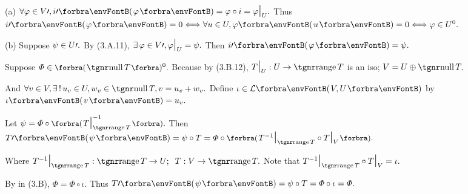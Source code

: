 \par\quad
(a) $\forall\varphi\in V\apostrophe,i\apostrophe\Par{\varphi}=\varphi\circ i=\varphi\mmid_U.$ Thus $i\apostrophe\Par{\varphi}=0\Longleftrightarrow\forall u\in U,\varphi\Par{u}=0\Longleftrightarrow\varphi\in U^0.$\par\quad
(b) Suppose $\psi\in U\prime.$ By (3.A.11), $\exists\,\varphi\in V\prime,\varphi\text{\Large|}_U=\psi.$ Then $i\apostrophe\Par{\varphi}=\psi.$\PfEnd
\SepLine

\par\quad
Suppose $\varPhi\in\BigPar{\null T}{^0}.$ Because by (3.B.12), $T\mmid_U:U\rightarrow\range T$ is an iso; $V=U\oplus\null T.$\par\quad
And $\forall v\in V,\exists\,!\,u_v\in U,w_v\in\null T,v=u_v+w_v.$ Define $\iota\in\Lm{V,U}$ by $\iota\Par{v}=u_v.$\vspace{4pt}\par\quad
Let $\psi=\varPhi\circ\BigPar{T\mmid_{\range T}^{-1}}.$ Then $T\apostrophe\Par{\psi}=\psi\circ T=\varPhi\circ\BigPar{T^{-1}\mmid_{\range T}\circ T\mmid_V}.$\vspace{2pt}\par\quad
Where $T^{-1}\mmid_{\range T}:\range T\rightarrow U;\;\;T:V\rightarrow\range T.$ Note that $T^{-1}\mmid_{\range T}\circ T\mmid_V=\iota.$\vspace{2pt}\par\quad
By \TIPS in (3.B), $\varPhi=\varPhi\circ \iota.$ Thus $T\apostrophe\Par{\psi}=\psi\circ T=\varPhi\circ{\iota}=\varPhi.$\PfEnd
\SepLine

